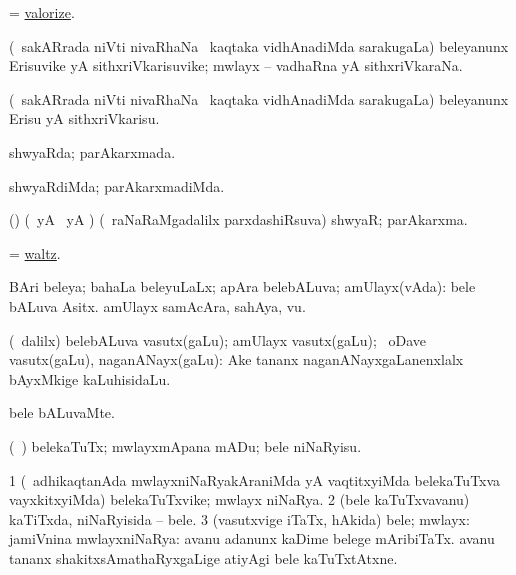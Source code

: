 \bentry
{} 
\gl{\sakirx}
\expl{}
\bmng
 = \hyperlink{valorize}{valorize}. 
\emng
\eentry

\bentry
{} 
\gl{\nA}
\expl{}
\bmng
 (\kanmu\ sakARrada niVti nivaRhaNa \mo\ kaqtaka vidhAnadiMda sarakugaLa) beleyanunx Erisuvike yA sithxriVkarisuvike; mwlayx -- vadhaRna yA sithxriVkaraNa. 
\emng
\eentry

\bentry
{} 
\gl{\sakirx}
\expl{}
\bmng
 (\kanmu\ sakARrada niVti nivaRhaNa \mo\ kaqtaka vidhAnadiMda sarakugaLa) beleyanunx Erisu yA sithxriVkarisu. 
\emng
\eentry

\bentry
{} 
\gl{\gu}
\expl{}
\bmng
shwyaRda; parAkarxmada. 
\emng
\eentry

\bentry
{} 
\gl{\kirxvi}
\expl{}
\bmng
 shwyaRdiMda; parAkarxmadiMda. 
\emng
\eentry

\bentry
{} 
\gl{\nA}
\expl{}
\bmng
 (\birx) (\kAparx\ yA \hA\ yA \aupa) (\kanmu\ raNaRaMgadalilx parxdashiRsuva) shwyaR; parAkarxma. 
\emng
\eentry

\bentry
{} 
\gl{\nA}
\expl{}
\bmng
= \hyperref{kandict_w.pdf}{W}{waltz(1)}{waltz}. 
\emng
\eentry

\bentry
{} 
\gl{\gu}
\expl{}
\bmng
 BAri beleya; bahaLa beleyuLaLx; apAra belebALuva; amUlayx(vAda):  bele bALuva Asitx.  amUlayx samAcAra, sahAya, \mo vu. 
\emng
\eentry

\bentry
{} 
\gl{\nA}
\expl{}
\bmng
 (\sA\ \bava dalilx) belebALuva vasutx(gaLu); amUlayx vasutx(gaLu); \kanmu\ oDave vasutx(gaLu), naganANayx(gaLu):  Ake tananx naganANayxgaLanenxlalx bAyxMkige kaLuhisidaLu. 
\emng
\eentry

\bentry
{} 
\gl{\kirxvi}
\expl{}
\bmng
 bele bALuvaMte. 
\emng
\eentry

\bentry
{} 
\gl{\akirx}
\expl{}
\bmng
 (\kanmu\ \ame) belekaTuTx; mwlayxmApana mADu; bele niNaRyisu. 
\emng
\eentry

\bentry
{} 
\gl{\nA}
\expl{}
\bmng
\bnum
\num{1} (\kanmu\ adhikaqtanAda mwlayxniNaRyakAraniMda yA vaqtitxyiMda belekaTuTxva vayxkitxyiMda) belekaTuTxvike; mwlayx niNaRya. 
\num{2} (bele kaTuTxvavanu) kaTiTxda, niNaRyisida -- bele. 
\num{3} (vasutxvige iTaTx, hAkida) bele; mwlayx:  jamiVnina mwlayxniNaRya:  avanu adanunx kaDime belege mAribiTaTx.  avanu tananx shakitxsAmathaRyxgaLige atiyAgi bele kaTuTxtAtxne. 
\enum
\emng
\eentry

